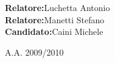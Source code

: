 \begin{center}
  \begin{normalsize}
    \textbf{Relatore:}\hspace{10pt}Luchetta Antonio\vspace{5pt}\\
    \textbf{Relatore:}\hspace{10pt}Manetti Stefano\vspace{5pt}\\
    \textbf{Candidato:}\hspace{10pt}Caini Michele\vspace{5pt}\\
  \end{normalsize}
  \vspace{1.5cm}
   A.A. 2009/2010
\end{center}
